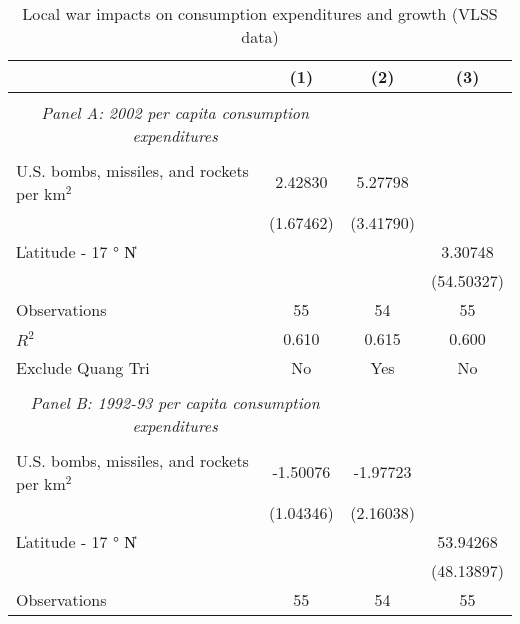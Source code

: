 \begin{table}[htbp]\centering \\ \def\sym#1{\ifmmode^{#1}\else\(^{#1}\)\fi} \\ \caption{Local war impacts on consumption expenditures and growth (VLSS data)} \\ \begin{tabular}{l*{3}{c}} \hline\hline
                    &\multicolumn{1}{c}{(1)}         &\multicolumn{1}{c}{(2)}         &\multicolumn{1}{c}{(3)}         \\
\hline \\ \multicolumn{2}{c}{\emph{Panel A: 2002 per capita consumption expenditures}} \\\\[-1ex]
U.S. bombs, missiles, and rockets per km$^2$&     2.42830         &     5.27798         &                     \\
                    &   (1.67462)         &   (3.41790)         &                     \\
[1em]
\|Latitude - 17 $°$ N\|&                     &                     &     3.30748         \\
                    &                     &                     &  (54.50327)         \\
\hline
Observations        &          55         &          54         &          55         \\
\(R^{2}\)           &       0.610         &       0.615         &       0.600         \\
Exclude Quang Tri   &          No         &         Yes         &          No         \\
\hline \\ \multicolumn{2}{c}{\emph{Panel B: 1992-93 per capita consumption expenditures}} \\\\[-1ex]
U.S. bombs, missiles, and rockets per km$^2$&    -1.50076         &    -1.97723         &                     \\
                    &   (1.04346)         &   (2.16038)         &                     \\
[1em]
\|Latitude - 17 $°$ N\|&                     &                     &    53.94268         \\
                    &                     &                     &  (48.13897)         \\
\hline
Observations        &          55         &          54         &          55         \\

\end{tabular}
\end{table}
